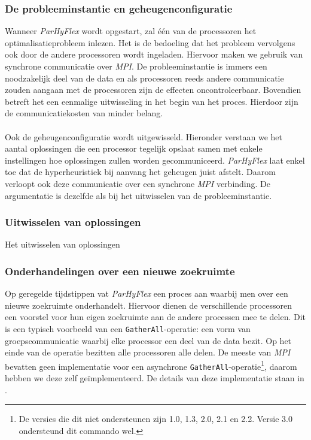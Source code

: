 \subsubsection{De probleeminstantie en geheugenconfiguratie}

Wanneer \emph{ParHyFlex} wordt opgestart, zal \'e\'en van de processoren het optimalisatieprobleem inlezen. Het is de bedoeling dat het probleem vervolgens ook door de andere processoren wordt ingeladen. Hiervoor maken we gebruik van synchrone communicatie over \emph{MPI}. De probleeminstantie is immers een noodzakelijk deel van de data en als processoren reeds andere communicatie zouden aangaan met de processoren zijn de effecten oncontroleerbaar. Bovendien betreft het een eenmalige uitwisseling in het begin van het proces. Hierdoor zijn de communicatiekosten van minder belang.

\paragraph{}
Ook de geheugenconfiguratie wordt uitgewisseld. Hieronder verstaan we het aantal oplossingen die een processor tegelijk opslaat samen met enkele instellingen hoe oplossingen zullen worden gecommuniceerd. \emph{ParHyFlex} laat enkel toe dat de hyperheuristiek bij aanvang het geheugen juist afstelt. Daarom verloopt ook deze communicatie over een synchrone \emph{MPI} verbinding. De argumentatie is dezelfde als bij het uitwisselen van de probleeminstantie.

\subsubsection{Uitwisselen van oplossingen}

Het uitwisselen van oplossingen

\subsubsection{Onderhandelingen over een nieuwe zoekruimte}

Op geregelde tijdstippen vat \emph{ParHyFlex} een proces aan waarbij men over een nieuwe zoekruimte onderhandelt. Hiervoor dienen de verschillende processoren een voorstel voor hun eigen zoekruimte aan de andere processen mee te delen. Dit is een typisch voorbeeld van een \texttt{GatherAll}-operatie: een vorm van groepscommunicatie waarbij elke processor een deel van de data bezit. Op het einde van de operatie bezitten alle processoren alle delen. De meeste van \emph{MPI} bevatten geen implementatie voor een asynchrone \texttt{GatherAll}-operatie\footnote{De versies die dit niet ondersteunen zijn 1.0\cite{mpi10}, 1.3\cite{mpi13}, 2.0\cite{conf/europar/GeistGHLLSSS96,mpi20}, 2.1\cite{mpi21} en 2.2\cite{mpi22}. Versie 3.0\cite{mpi30} ondersteund dit commando wel.}, daarom hebben we deze zelf ge\"implementeerd. De details van deze implementatie staan in .

